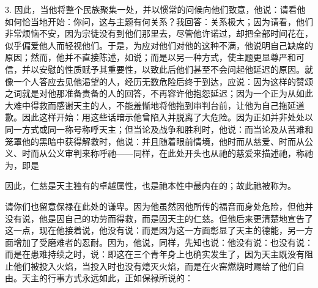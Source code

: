 3. 因此，当他将整个民族聚集一处，并以惯常的问候向他们致意，他说：请看他如何恰当地开始：你问，这与主题有何关系？我回答：关系极大；因为请看，他们非常烦恼不安，因为宗徒没有到他们那里去，尽管他许诺过，却把全部时间花在，似乎偏爱他人而轻视他们。于是，为应对他们对他的这种不满，他说明自己缺席的原因；然而，他并不直接陈述，如说；而是以另一种方式，使主题更显尊严和可信，并以安慰的性质赋予其重要性，以致此后他们甚至不会问起他延迟的原因。就像一个人答应去见他渴望的人，经历无数危险后终于到达，应说：因为这样的赞颂之词就是对他那准备责备的人的回答，不再容许他抱怨延迟；因为一个正为从如此大难中得救而感谢天主的人，不能羞惭地将他拖到审判台前，让他为自己拖延道歉。因此这样开始：用这些话暗示他曾陷入并脱离了大危险。因为正如并非处处以同一方式或同一称号称呼天主；但当论及战争和胜利时，他说：而当论及从苦难和笼罩他的黑暗中获得解救时，他说：并且随着眼前情境，他时而从慈爱、时而从公义、时而从公义审判来称呼祂——同样，在此处开头也从祂的慈爱来描述祂，称祂为，即是\par

因此，仁慈是天主独有的卓越属性，也是祂本性中最内在的；故此祂被称为。\par

请你们也留意保禄在此处的谦卑。因为他虽然因他所传的福音而身处危险，但他并没有说，他是因自己的功劳而得救，而是因天主的仁慈。但他后来更清楚地宣告了这一点，现在他接着说，他没有说：而是因为这一方面彰显了天主的德能，另一方面增加了受磨难者的忍耐。因为，他说，同样，先知也说：他没有说：也没有说：而是在患难持续之时，说：即这在三个青年身上也确实发生了，因为天主既没有阻止他们被投入火焰，当投入时也没有熄灭火焰，而是在火窑燃烧时赐给了他们自由。天主的行事方式永远如此，正如保禄所说的：\par

